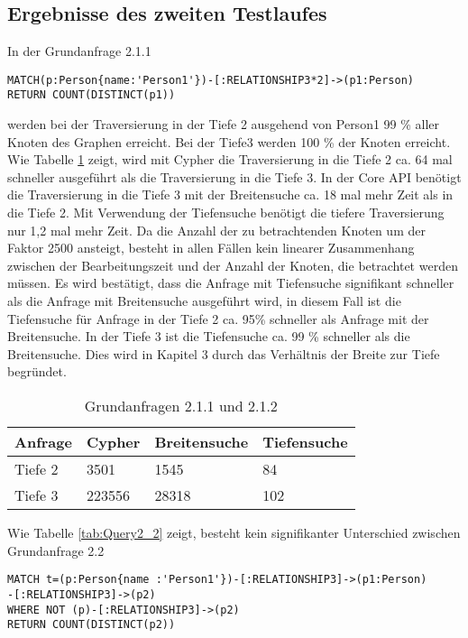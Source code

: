 \subsection{Ergebnisse des zweiten Testlaufes}
In der Grundanfrage 2.1.1
\begin{Verbatim}[frame=single]
MATCH(p:Person{name:'Person1'})-[:RELATIONSHIP3*2]->(p1:Person) 
RETURN COUNT(DISTINCT(p1))
\end{Verbatim}
 werden bei der Traversierung in der Tiefe 2 ausgehend von Person1 99 \% aller Knoten des Graphen erreicht. Bei der Tiefe3 werden 100 \% der Knoten erreicht. Wie Tabelle \ref{tab:Query2_1} zeigt, wird mit Cypher die Traversierung in die Tiefe 2 ca. 64 mal schneller ausgeführt als die Traversierung in die Tiefe 3. In der Core API benötigt die Traversierung in die Tiefe 3 mit der Breitensuche ca. 18 mal mehr Zeit als in die Tiefe 2. Mit Verwendung der Tiefensuche benötigt die tiefere Traversierung nur 1,2 mal mehr Zeit. Da die Anzahl der zu betrachtenden Knoten um der Faktor 2500 ansteigt, besteht in allen Fällen kein linearer Zusammenhang zwischen der Bearbeitungszeit und der Anzahl der Knoten, die betrachtet werden müssen. \newline 
Es wird bestätigt, dass die Anfrage mit Tiefensuche signifikant schneller als die Anfrage mit Breitensuche ausgeführt wird, in diesem Fall ist die Tiefensuche für  Anfrage in der Tiefe 2 ca. 95\% schneller als Anfrage mit der Breitensuche. In der Tiefe 3 ist die Tiefensuche ca. 99 \% schneller als die Breitensuche. Dies wird in Kapitel 3 durch das Verhältnis der Breite zur Tiefe begründet. 
\FloatBarrier
\begin{table}[h]
\centering
		\begin{tabular}{ |p{3cm}||p{3cm}|p{3cm}|p{3cm}|  }
			\hline
			Anfrage& Cypher & Breitensuche&Tiefensuche\\
			\hline
			Tiefe 2   & 3501    & 1545&   84\\
			Tiefe 3&    223556  & 28318   & 102\\
			\hline
		\end{tabular}
		\caption{Grundanfragen 2.1.1 und 2.1.2}
		\label{tab:Query2_1}
\end{table}
\FloatBarrier
\noindent Wie Tabelle \ref{tab:Query2_2} zeigt, besteht kein  signifikanter Unterschied zwischen Grundanfrage 2.2
\begin{Verbatim}[frame=single]
MATCH t=(p:Person{name :'Person1'})-[:RELATIONSHIP3]->(p1:Person)
-[:RELATIONSHIP3]->(p2)
WHERE NOT (p)-[:RELATIONSHIP3]->(p2) 
RETURN COUNT(DISTINCT(p2))
\end{Verbatim} 
